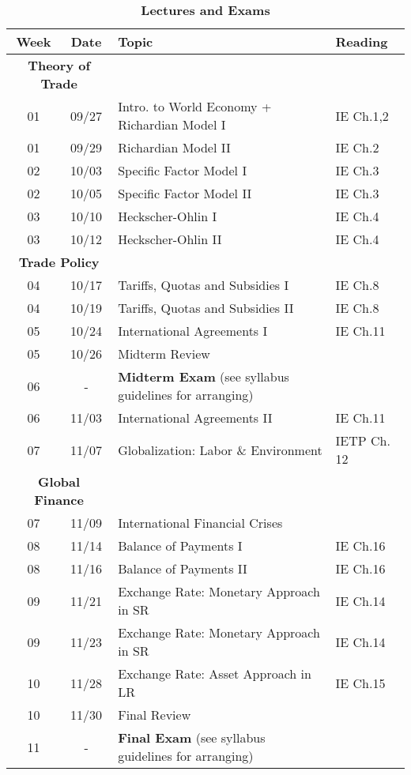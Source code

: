 \documentclass[10pt]{article}
\newcommand{\ra}[1]{\renewcommand{\arraystretch}{#1}}
\begin{document}
\begin{table}[h!]
	\caption*{\large\textbf{Lectures and Exams}}
	\centering
	\ra{1.5}
	\begin{tabular}{@{\extracolsep{0.5cm}} c c l l @{}}
		\toprule
		\textbf{Week} & \textbf{Date} & \textbf{Topic} & \textbf{Reading}  \\ \toprule
		 \multicolumn{2}{c}{\textbf{Theory of Trade}} & & \\
		01 & 09/27 & Intro. to World Economy + Richardian Model I & IE Ch.1,2 \\
		01 & 09/29 & Richardian Model II & IE Ch.2 \\
		02 & 10/03 & Specific Factor Model I & IE Ch.3 \\
		02 & 10/05 &  Specific Factor Model II & IE Ch.3 \\
		03 & 10/10 & Heckscher-Ohlin I & IE Ch.4  \\
		03 & 10/12 & Heckscher-Ohlin II  & IE Ch.4  \\ 
		\multicolumn{2}{c}{\textbf{Trade Policy}} & & \\
		04 & 10/17 & Tariffs, Quotas and Subsidies I & IE Ch.8\\ 
		04 & 10/19 & Tariffs, Quotas and Subsidies II & IE Ch.8  \\
		05 & 10/24 & International Agreements I & IE Ch.11 \\
		05 & 10/26 & Midterm Review & \\ \midrule 
		06 & - & \textbf{Midterm Exam} (see syllabus guidelines for arranging) & \\ \midrule
		06 & 11/03 & International Agreements II & IE Ch.11  \\
		07 & 11/07 & Globalization: Labor \& Environment  &  IETP Ch. 12 \\
		\multicolumn{2}{c}{\textbf{Global Finance}} & & \\
		07 & 11/09 & International Financial Crises &    \\ 
		08 & 11/14 & Balance of Payments I & IE Ch.16  \\ 
		08 & 11/16 & Balance of Payments II & IE Ch.16 \\
		09 & 11/21 & Exchange Rate: Monetary Approach in SR & IE Ch.14  \\
		09 & 11/23 & Exchange Rate: Monetary Approach in SR & IE Ch.14   \\
		10 & 11/28 & Exchange Rate: Asset Approach in LR & IE Ch.15 \\ 
		10 & 11/30 & Final Review &   \\  \midrule
		11 & - & \textbf{Final Exam} (see syllabus guidelines for arranging) & \\
		\bottomrule
	\end{tabular}
\end{table}
\end{document}
